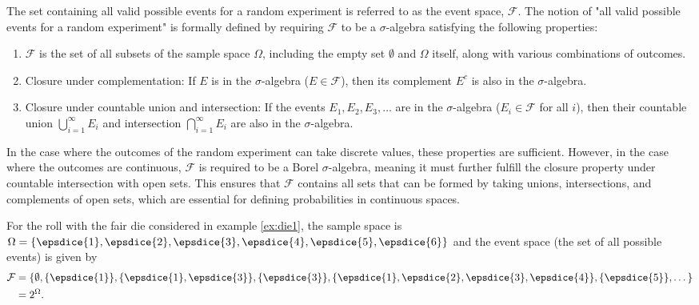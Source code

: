 \begin{definition}
	The set containing all valid possible events for a random experiment is referred to as the event space, $\mathcal{F}$. The notion of "all valid possible events for a random experiment" is formally defined by requiring $\mathcal{F}$ to be a $\sigma$-algebra satisfying the following properties:
	\begin{enumerate}
		\item $\mathcal{F}$ is the set of all subsets of the sample space $\Omega$, including the empty set $\emptyset$ and $\Omega$ itself, along with various combinations of outcomes.
		\item Closure under complementation: If $E$ is in the $\sigma$-algebra ($E \in \mathcal{F}$), then its complement $E^c$ is also in the $\sigma$-algebra.
		\item Closure under countable union and intersection: If the events $E_1, E_2, E_3, \dots$ are in the $\sigma$-algebra ($E_i \in \mathcal{F}$ for all $i$), then their countable union $\bigcup_{i=1}^{\infty} E_i$ and intersection $\bigcap_{i=1}^{\infty} E_i$ are also in the $\sigma$-algebra.
	\end{enumerate}
	In the case where the outcomes of the random experiment can take discrete values, these properties are sufficient. However, in the case where the outcomes are continuous, $\mathcal{F}$ is required to be a Borel $\sigma$-algebra, meaning it must further fulfill the closure property under countable intersection with open sets. This ensures that $\mathcal{F}$ contains all sets that can be formed by taking unions, intersections, and complements of open sets, which are essential for defining probabilities in continuous spaces.
\end{definition}


\begin{example}
	\label{ex:die2}
	For the roll with the fair die considered in example \ref{ex:die1}, the sample space is $\Omega = \{ \epsdice{1}, \epsdice{2}, \epsdice{3}, \epsdice{4}, \epsdice{5}, \epsdice{6} \}$ and the event space (the set of all possible events) is given by
	\begin{equation}
		\begin{split}
			\mathcal{F}&=\{\emptyset, \{\epsdice{1}\},\{\epsdice{1},\epsdice{3}\},\{\epsdice{3}\},\{\epsdice{1},\epsdice{2},\epsdice{3},\epsdice{4}\},\{\epsdice{5}\},\dots\}\\
			& = 2^\Omega.
		\end{split}
	\end{equation}
\end{example}

